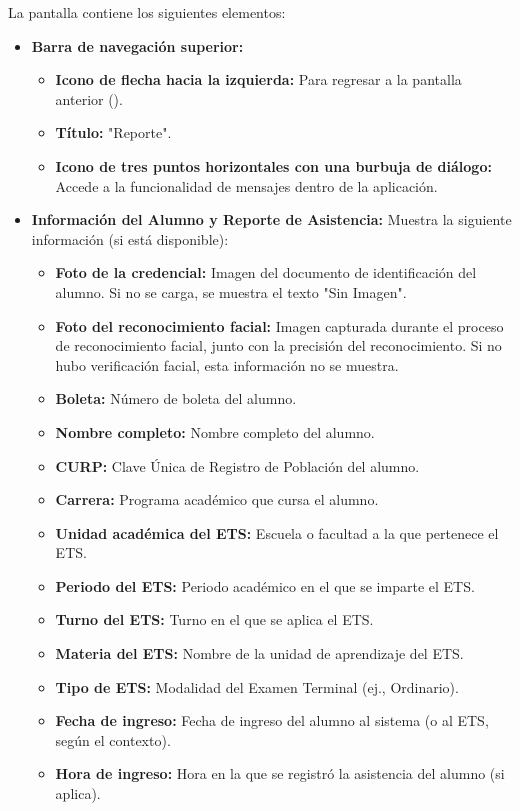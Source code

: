 La pantalla contiene los siguientes elementos:
\begin{itemize}
	\item \textbf{Barra de navegación superior:}
	\begin{itemize}
		\item \textbf{Icono de flecha hacia la izquierda:} Para regresar a la pantalla anterior ().
		\item \textbf{Título:} "Reporte".
		\item \textbf{Icono de tres puntos horizontales con una burbuja de diálogo:} Accede a la funcionalidad de mensajes dentro de la aplicación.
	\end{itemize}
	\item \textbf{Información del Alumno y Reporte de Asistencia:} Muestra la siguiente información (si está disponible):
	\begin{itemize}
		\item \textbf{Foto de la credencial:} Imagen del documento de identificación del alumno. Si no se carga, se muestra el texto "Sin Imagen".
		\item \textbf{Foto del reconocimiento facial:} Imagen capturada durante el proceso de reconocimiento facial, junto con la precisión del reconocimiento. Si no hubo verificación facial, esta información no se muestra.
		\item \textbf{Boleta:} Número de boleta del alumno.
		\item \textbf{Nombre completo:} Nombre completo del alumno.
		\item \textbf{CURP:} Clave Única de Registro de Población del alumno.
		\item \textbf{Carrera:} Programa académico que cursa el alumno.
		\item \textbf{Unidad académica del ETS:} Escuela o facultad a la que pertenece el ETS.
		\item \textbf{Periodo del ETS:} Periodo académico en el que se imparte el ETS.
		\item \textbf{Turno del ETS:} Turno en el que se aplica el ETS.
		\item \textbf{Materia del ETS:} Nombre de la unidad de aprendizaje del ETS.
		\item \textbf{Tipo de ETS:} Modalidad del Examen Terminal (ej., Ordinario).
		\item \textbf{Fecha de ingreso:} Fecha de ingreso del alumno al sistema (o al ETS, según el contexto).
		\item \textbf{Hora de ingreso:} Hora en la que se registró la asistencia del alumno (si aplica).

\end{itemize}
\end{itemize}
